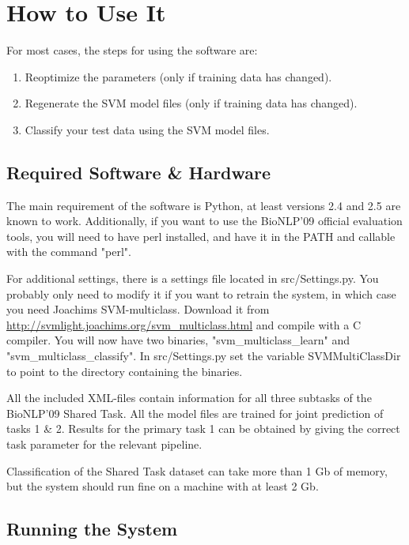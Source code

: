 \documentclass[a4paper,12pt]{article}
\begin{document}
\section{How to Use It}

For most cases, the steps for using the software are:

\begin{enumerate}
  \item Reoptimize the parameters (only if training data has changed).
  \item Regenerate the SVM model files (only if training data has changed).
  \item Classify your test data using the SVM model files.
\end{enumerate}

\subsection{Required Software \& Hardware}
\label{sec-requirements}

The main requirement of the software is Python, at least versions 2.4 and 2.5 are
known to work. Additionally, if you want to use the BioNLP'09 official evaluation
tools, you will need to have perl installed, and have it in the PATH and callable
with the command "perl".

For additional settings, there is a settings file located in src/Settings.py. You
probably only need to modify it if you want to retrain the system, in which case
you need Joachims SVM-multiclass. Download it from
\url{http://svmlight.joachims.org/svm\_multiclass.html} and compile with a C
compiler. You will now have two binaries, "svm\_multiclass\_learn" and
"svm\_multiclass\_classify". In src/Settings.py set the variable SVMMultiClassDir
to point to the directory containing the binaries.

All the included XML-files contain information for all three subtasks of the
BioNLP'09 Shared Task. All the model files are trained for joint prediction of
tasks 1 \& 2. Results for the primary task 1 can be obtained by giving the
correct task parameter for the relevant pipeline.

Classification of the Shared Task dataset can take more than 1 Gb of memory, but
the system should run fine on a machine with at least 2 Gb.

\subsection{Running the System}
\label{sec-running}
\end{document}
